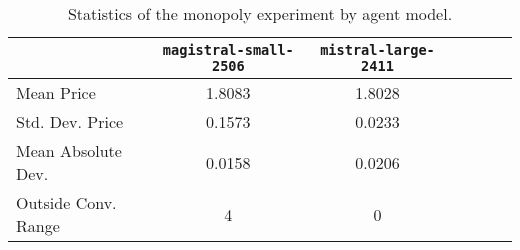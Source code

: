 \begin{table}[H]
\centering
\caption{Statistics of the monopoly experiment by agent model.}
\label{tab:monopoly_stats}
\begin{tabular}{lcccccc}
\toprule
 & \texttt{magistral-small-2506} & \texttt{mistral-large-2411} \\
\midrule
Mean Price & 1.8083 & 1.8028 \\
Std. Dev. Price & 0.1573 & 0.0233 \\
Mean Absolute Dev. & 0.0158 & 0.0206 \\
Outside Conv. Range & 4 & 0 \\
\bottomrule
\end{tabular}
\end{table}
